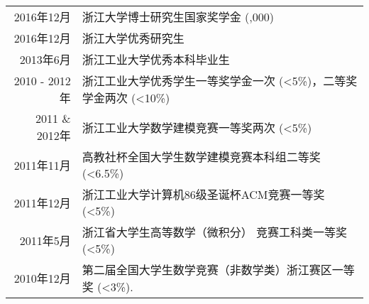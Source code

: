 %
%




\begin{tabular}{rl}	
	2016年12月 & 浙江大学博士研究生国家奖学金  (\textyen 30,000) \\
	2016年12月 & 浙江大学优秀研究生 \\
	2013年6月 & 浙江工业大学优秀本科毕业生 \\
	2010 - 2012年 & 浙江工业大学优秀学生一等奖学金一次 (<5\%)，二等奖学金两次 (<10\%)\\
	2011 \& 2012年 & 浙江工业大学数学建模竞赛一等奖两次 (<5\%)\\
	2011年11月 & 高教社杯全国大学生数学建模竞赛本科组二等奖 (<6.5\%)\\
	2011年12月 & 浙江工业大学计算机86级圣诞杯ACM竞赛一等奖 (<5\%)\\
	2011年5月 & 浙江省大学生高等数学（微积分） 竞赛工科类一等奖 (<5\%)\\
	2010年12月 & 第二届全国大学生数学竞赛（非数学类）浙江赛区一等奖 (<3\%).	
\end{tabular}

